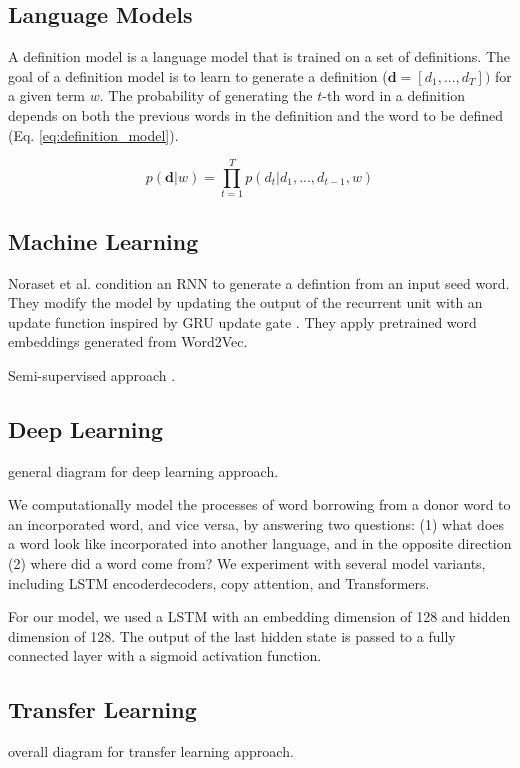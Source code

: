 \subsection{Language Models}
A definition model is a language model that is trained on a set of definitions.
The goal of a definition model is to learn to generate a definition %
($\textbf{d} = [d_1, ..., d_T])$ for a given term $w$. The probability of
generating the $t$-th word in a definition depends on both the previous words in
the definition and the word to be defined (Eq. \ref{eq:definition_model}).

\begin{equation}
    \label{eq:definition_model}
    p(\textbf{d} | w) = \prod_{t=1}^{T} p(d_t | d_1,...,d_{t-1}, w)
\end{equation}

\subsection{Machine Learning}
Noraset et al. condition an RNN to generate a defintion from an input seed word.
They modify the model by updating the output of the recurrent unit with an
update function inspired by GRU update gate \cite{noraset_definition_2016}. They
apply pretrained word embeddings generated from Word2Vec.

Semi-supervised approach \cite{patra_bilingual_2019}.

\subsection{Deep Learning}
general diagram for deep learning approach.

\cite{wu_2021_sequence}We computationally model the processes of
word borrowing from a donor word to an incorporated
word, and vice versa, by answering
two questions: (1) what does a word look
like incorporated into another language, and
in the opposite direction (2) where did a word
come from? We experiment with several
model variants, including LSTM encoderdecoders,
copy attention, and Transformers.

\cite{wu_computational_2020} For our model, we used a LSTM with an embedding
dimension of 128 and hidden dimension of 128.
The output of the last hidden state is passed to a fully connected layer with a sigmoid activation function.


\subsection{Transfer Learning}
overall diagram for transfer learning approach.

